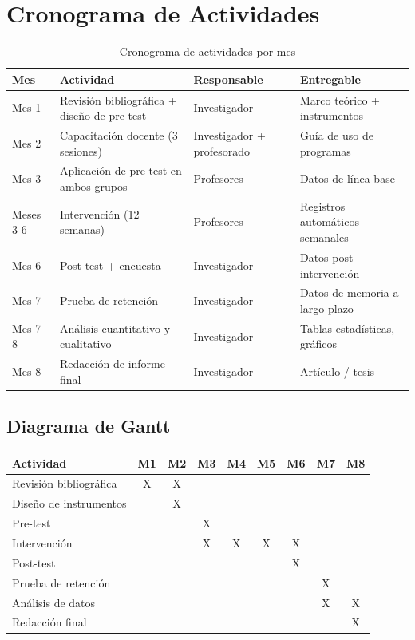 \documentclass[12pt,spanish]{article}
\begin{document}
\newpage
\section{Cronograma de Actividades}

\begin{table}[H]
\centering
\caption{Cronograma de actividades por mes}
\label{tab:cronograma}
\begin{tabular}{|p{3.5cm}|p{4cm}|p{3.5cm}|p{3.5cm}|}
\hline
\textbf{Mes} & \textbf{Actividad} & \textbf{Responsable} & \textbf{Entregable} \\
\hline
Mes 1 & Revisión bibliográfica + diseño de pre-test & Investigador & Marco teórico + instrumentos \\
\hline
Mes 2 & Capacitación docente (3 sesiones) & Investigador + profesorado & Guía de uso de programas \\
\hline
Mes 3 & Aplicación de pre-test en ambos grupos & Profesores & Datos de línea base \\
\hline
Meses 3-6 & Intervención (12 semanas) & Profesores & Registros automáticos semanales \\
\hline
Mes 6 & Post-test + encuesta & Investigador & Datos post-intervención \\
\hline
Mes 7 & Prueba de retención & Investigador & Datos de memoria a largo plazo \\
\hline
Mes 7-8 & Análisis cuantitativo y cualitativo & Investigador & Tablas estadísticas, gráficos \\
\hline
Mes 8 & Redacción de informe final & Investigador & Artículo / tesis \\
\hline
\end{tabular}
\end{table}

\subsection{Diagrama de Gantt}

\begin{center}
\begin{tabular}{|l|c|c|c|c|c|c|c|c|}
\hline
\textbf{Actividad} & \textbf{M1} & \textbf{M2} & \textbf{M3} & \textbf{M4} & \textbf{M5} & \textbf{M6} & \textbf{M7} & \textbf{M8} \\
\hline
Revisión bibliográfica & X & X & & & & & & \\
\hline
Diseño de instrumentos & & X & & & & & & \\
\hline
Pre-test & & & X & & & & & \\
\hline
Intervención & & & X & X & X & X & & \\
\hline
Post-test & & & & & & X & & \\
\hline
Prueba de retención & & & & & & & X & \\
\hline
Análisis de datos & & & & & & & X & X \\
\hline
Redacción final & & & & & & & & X \\
\hline
\end{tabular}
\end{center}
\end{document}

